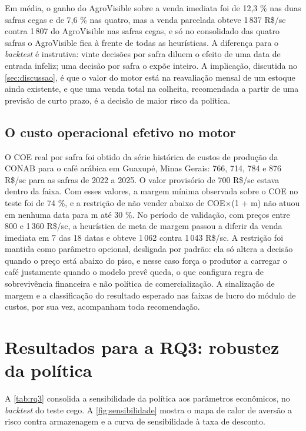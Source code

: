 Em média, o ganho do AgroVisible sobre a venda imediata foi de 12,3 \% nas duas safras cegas e de 7,6 \% nas quatro, mas a venda parcelada obteve 1\,837 R\$/sc contra 1\,807 do AgroVisible nas safras cegas, e só no consolidado das quatro safras o AgroVisible fica à frente de todas as heurísticas. A diferença para o \textit{backtest} é instrutiva: vinte decisões por safra diluem o efeito de uma data de entrada infeliz; uma decisão por safra o expõe inteiro. A implicação, discutida no \autoref{sec:discussao}, é que o valor do motor está na reavaliação mensal de um estoque ainda existente, e que uma venda total na colheita, recomendada a partir de uma previsão de curto prazo, é a decisão de maior risco da política.

\subsection{O custo operacional efetivo no motor}

O COE real por safra foi obtido da série histórica de custos de produção da CONAB para o café arábica em Guaxupé, Minas Gerais: 766, 714, 784 e 876 R\$/sc para as safras de 2022 a 2025. O valor provisório de 700 R\$/sc estava dentro da faixa. Com esses valores, a margem mínima observada sobre o COE no teste foi de 74 \%, e a restrição de não vender abaixo de COE$\times$(1 + m) não atuou em nenhuma data para m até 30 \%. No período de validação, com preços entre 800 e 1\,360 R\$/sc, a heurística de meta de margem passou a diferir da venda imediata em 7 das 18 datas e obteve 1\,062 contra 1\,043 R\$/sc. A restrição foi mantida como parâmetro opcional, desligada por padrão: ela só altera a decisão quando o preço está abaixo do piso, e nesse caso força o produtor a carregar o café justamente quando o modelo prevê queda, o que configura regra de sobrevivência financeira e não política de comercialização. A sinalização de margem e a classificação do resultado esperado nas faixas de lucro do módulo de custos, por sua vez, acompanham toda recomendação.

\section{Resultados para a RQ3: robustez da política}\label{sec2:res-rq3}

A \autoref{tab:rq3} consolida a sensibilidade da política aos parâmetros econômicos, no \textit{backtest} do teste cego. A \autoref{fig:sensibilidade} mostra o mapa de calor de aversão a risco contra armazenagem e a curva de sensibilidade à taxa de desconto.

